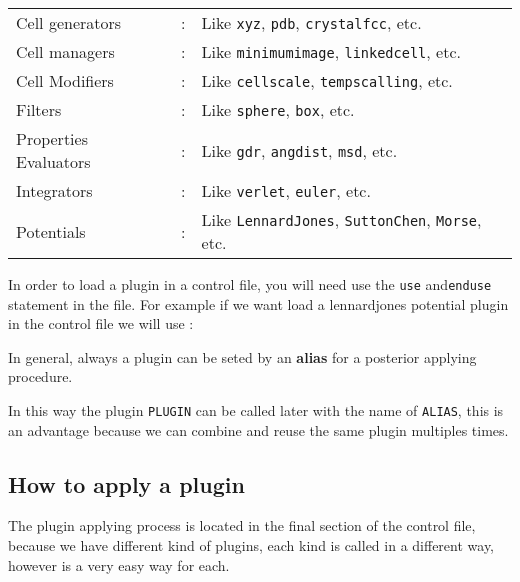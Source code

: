 \begin{tabular}{lcl}
 Cell generators & : &Like \verb|xyz|, \verb|pdb|, \verb|crystalfcc|,
etc. \\
 Cell managers & : &Like \verb|minimumimage|, \verb|linkedcell|, etc. \\
 Cell Modifiers & : &Like \verb|cellscale|, \verb|tempscalling|, etc.\\
 Filters & : &Like \verb|sphere|, \verb|box|, etc.\\
 Properties Evaluators & : &Like \verb|gdr|, \verb|angdist|, \verb|msd|, etc.
\\
 Integrators & : &Like \verb|verlet|, \verb|euler|, etc. \\
 Potentials & : &Like \verb|LennardJones|, \verb|SuttonChen|, \verb|Morse|,
etc. \\
\end{tabular}

In order to load a plugin in a control file, you will need use the \verb|use|
and\verb|enduse| statement in the file. For example if we want load a
lennardjones potential plugin in the control file we will use :


In general, always a plugin can be seted by an \textbf{alias} for a posterior
applying procedure.


In this way the plugin \texttt{PLUGIN} can be called later with the name of
\texttt{ALIAS}, this is an advantage because we can combine and reuse the same
plugin multiples times.

\subsection{How to apply a plugin}

The plugin applying process is located in the final section of the control
file, because we have different kind of plugins, each kind is called in a
different way, however is a very easy way for each.


